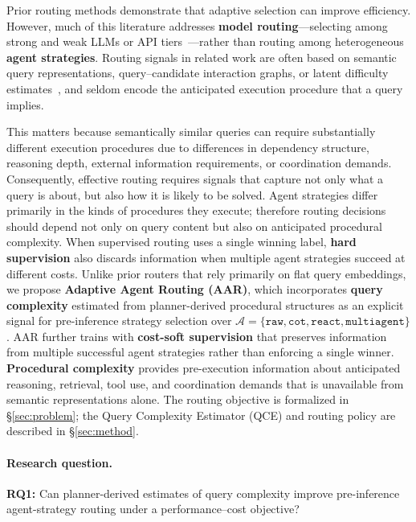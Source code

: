 Prior routing methods demonstrate that adaptive selection can improve efficiency.
However, much of this literature addresses \textbf{model routing}---selecting among strong and
weak LLMs or API tiers~\citep{ong2025routellm,chen2024routerdc}---rather than routing among
heterogeneous \textbf{agent strategies}.
Routing signals in related work are often based on semantic query representations,
query--candidate interaction graphs, or latent difficulty
estimates~\citep{feng2025graphrouter,su2026daao}, and seldom encode the anticipated execution
procedure that a query implies.

This matters because semantically similar queries can require substantially different execution
procedures due to differences in dependency structure, reasoning depth, external information
requirements, or coordination demands.
Consequently, effective routing requires signals that capture not only what a query is about,
but also how it is likely to be solved.
Agent strategies differ primarily in the kinds of procedures they execute; therefore routing
decisions should depend not only on query content but also on anticipated procedural complexity.
When supervised routing uses a single winning label, \textbf{hard supervision} also discards
information when multiple agent strategies succeed at different costs.
Unlike prior routers that rely primarily on flat query embeddings, we propose
\textbf{Adaptive Agent Routing (AAR)}, which incorporates \textbf{query complexity}
estimated from planner-derived procedural structures as an explicit signal for pre-inference
strategy selection over
$\mathcal{A}=\{\texttt{raw},\texttt{cot},\texttt{react},\texttt{multiagent}\}$.
AAR further trains with \textbf{cost-soft supervision} that preserves information from multiple
successful agent strategies rather than enforcing a single winner.
\textbf{Procedural complexity} provides pre-execution information about anticipated reasoning,
retrieval, tool use, and coordination demands that is unavailable from semantic representations
alone.
The routing objective is formalized in \S\ref{sec:problem}; the Query Complexity Estimator (QCE)
and routing policy are described in \S\ref{sec:method}.

\paragraph{Research question.}
\textbf{RQ1:} Can planner-derived estimates of query complexity improve pre-inference
agent-strategy routing under a performance--cost objective?

